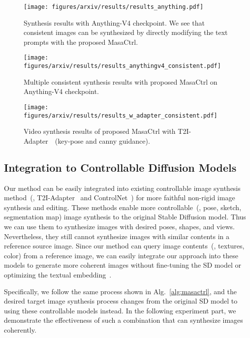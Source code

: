 \documentclass[10pt,twocolumn,letterpaper]{article}
\begin{document}
\begin{figure*}
    \centering
    \texttt{[image: figures/arxiv/results/results\_anything.pdf]}
    \caption{Synthesis results with Anything-V4 checkpoint. We see that consistent images can be synthesized by directly modifying the text prompts with the proposed MasaCtrl. }
    \label{fig:results_angthing}
\end{figure*}

\begin{figure*}
    \centering
    \texttt{[image: figures/arxiv/results/results\_anythingv4\_consistent.pdf]}
    \caption{Multiple consistent synthesis results with proposed MasaCtrl on Anything-V4 checkpoint. }
    \label{fig:coherent_synthesis}
\end{figure*}

\begin{figure*}
    \centering
    \texttt{[image: figures/arxiv/results/results\_w\_adapter\_consistent.pdf]}
    \caption{Video synthesis results of proposed MasaCtrl with T2I-Adapter~\cite{mou2023t2i}~(key-pose and canny guidance). }
    \label{fig:coherent_synthesis_adapter}
\end{figure*}

\subsection{Integration to Controllable Diffusion Models} \label{sec:controllable}

Our method can be easily integrated into existing controllable image synthesis method~(\eg, T2I-Adapter~\cite{mou2023t2i} and ControlNet~\cite{zhang2023adding}) for more faithful non-rigid image synthesis and editing.
These methods enable more controllable~(\eg, pose, sketch, segmentation map) image synthesis to the original Stable Diffusion model. Thus we can use them to synthesize images with desired poses, shapes, and views. Nevertheless, they still cannot synthesize images with similar contents in a reference source image. Since our method can query image contents~(\eg, textures, color) from a reference image, we can easily integrate our approach into these models to generate more coherent images without fine-tuning the SD model or optimizing the textual embedding~\cite{kawar2022imagic}. 

Specifically, we follow the same process shown in Alg.~\ref{alg:masactrl}, and the desired target image synthesis process changes from the original SD model to using these controllable models instead. In the following experiment part, we demonstrate the effectiveness of such a combination that can synthesize images coherently.
\end{document}

